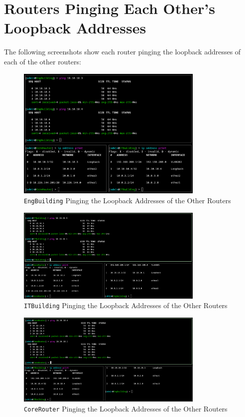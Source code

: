 \documentclass[a4paper]{article}
\begin{document}
\section{Routers Pinging Each Other's Loopback Addresses}
The following screenshots show each router pinging the loopback addresses of each of the other routers:
\begin{figure}[H]
    \centering
    \includegraphics[width=0.8\textwidth]{./images/eng_ping_loopback.png}
    \caption{\texttt{EngBuilding} Pinging the Loopback Addresses of the Other Routers}
\end{figure}

\begin{figure}[H]
    \centering
    \includegraphics[width=0.8\textwidth]{./images/it_ping_loopback.png}
    \caption{\texttt{ITBuilding} Pinging the Loopback Addresses of the Other Routers}
\end{figure}

\begin{figure}[H]
    \centering
    \includegraphics[width=0.8\textwidth]{./images/core_ping_loopback.png}
    \caption{\texttt{CoreRouter} Pinging the Loopback Addresses of the Other Routers}
\end{figure}
\end{document}
